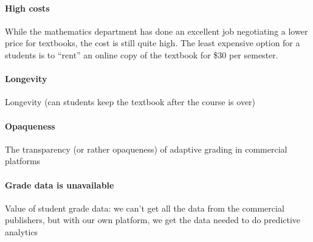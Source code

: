\documentclass{ximera}
\begin{document}
\paragraph{High costs}
While the mathematics department has done an excellent job negotiating
a lower price for textbooks, the cost is still quite high.  The least
expensive option for a students is to ``rent'' an online copy of the
textbook for \$30 per semester. 


\paragraph{Longevity}
Longevity (can students keep the textbook after the course is over)


\paragraph{Opaqueness}
The transparency (or rather opaqueness) of adaptive grading in commercial platforms

\paragraph{Grade data is unavailable}
Value of student grade data: we can't get all the data from the commercial publishers, but with our own platform, we get the data needed to do predictive analytics
\end{document}
